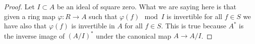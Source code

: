 \documentclass[10pt,a4paper]{amsart}
\theoremstyle{plain}
\theoremstyle{definition}
\theoremstyle{remark}
\numberwithin{equation}{subsection}
\begin{document}
\begin{proof}
Let $I \subset A$ be an ideal of square zero. What we are saying
here is that given a ring map $\varphi : R \to A$ such that
$\varphi(f) \mod I$ is invertible for all $f \in S$ we have also that
$\varphi(f)$ is invertible in $A$ for all $f \in S$. This is true because
$A^*$ is the inverse image of $(A/I)^*$ under the canonical map
$A \to A/I$.
\end{proof}
\end{document}
